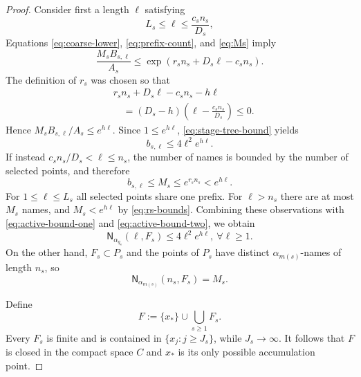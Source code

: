 \documentclass[10pt,a4paper]{amsart}
\newcommand{\Nname}{\mathsf N}
\numberwithin{equation}{section}
\begin{document}
\begin{proof}
		Consider first a length $\ell$ satisfying
		\[
		L_s\leq\ell\leq\frac{c_sn_s}{D_s},
		\]
		Equations \eqref{eq:coarse-lower}, \eqref{eq:prefix-count}, and
		\eqref{eq:Ms} imply
		\[
		\frac{M_sB_{s,\ell}}{A_s}
		\leq
		\exp(r_sn_s+D_s\ell-c_sn_s).
		\]
		The definition of $r_s$ was chosen so that
		\[
		\begin{aligned}
		&r_sn_s+D_s\ell-c_sn_s-h\ell\\
		&\quad=
		(D_s-h)\left(\ell-\frac{c_sn_s}{D_s}\right)\leq0.
		\end{aligned}
		\]
		Hence $M_sB_{s,\ell}/A_s\leq e^{h\ell}$.  Since
		$1\leq e^{h\ell}$, \eqref{eq:stage-tree-bound} yields
		\begin{equation}
			b_{s,\ell}\leq4\ell^2e^{h\ell}.
			\label{eq:active-bound-one}
		\end{equation}
		If instead $c_sn_s/D_s<\ell\leq n_s$, the number of names is bounded by
		the number of selected points, and therefore
		\begin{equation}
			b_{s,\ell}\leq M_s
			\leq e^{r_sn_s}
			<e^{h\ell}.
			\label{eq:active-bound-two}
		\end{equation}
		For $1\leq\ell\leq L_s$ all selected points share one prefix.  For
		$\ell>n_s$ there are at most $M_s$ names, and
		$M_s<e^{h\ell}$ by \eqref{eq:rs-bounds}.  Combining these observations with
		\eqref{eq:active-bound-one} and \eqref{eq:active-bound-two}, we obtain
		\begin{equation}
			\Nname_{\alpha_{q_s}}(\ell,F_s)
			\leq4\ell^2e^{h\ell},~\forall\ell\geq1.
			\label{eq:cloud-upper}
		\end{equation}
		On the other hand, $F_s\subset P_s$ and the points of $P_s$ have distinct
		$\alpha_{m(s)}$-names of length $n_s$, so
		\begin{equation}
			\Nname_{\alpha_{m(s)}}(n_s,F_s)=M_s.
			\label{eq:cloud-lower}
		\end{equation}
		
		Define
		\begin{equation}
			F:=\{x_*\}\cup\bigcup_{s\geq1}F_s.
			\label{eq:F-definition}
		\end{equation}
		Every $F_s$ is finite and is contained in $\{x_j:j\geq J_s\}$, while
		$J_s\to\infty$.  
		It follows that $F$ is closed in the compact space $C$ and $x_*$ is its only possible
		accumulation point.
		

\end{proof}
\end{document}
